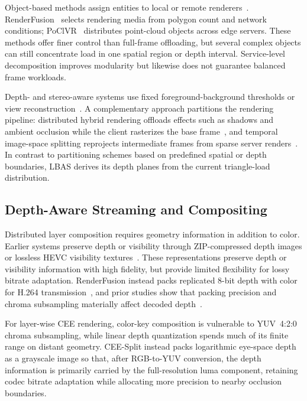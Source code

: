 \documentclass[acmsmall]{acmart}
\begin{document}
Object-based methods assign entities to local or remote renderers~\cite{lu_renderfusion_2023,wen_ar-light_2025,wu_edge-assisted_2024}. RenderFusion~\cite{lu_renderfusion_2023} selects rendering media from polygon count and network conditions; PoClVR~\cite{wu_edge-assisted_2024} distributes point-cloud objects across edge servers. These methods offer finer control than full-frame offloading, but several complex objects can still concentrate load in one spatial region or depth interval. Service-level decomposition improves modularity but likewise does not guarantee balanced frame workloads.

Depth- and stereo-aware systems use fixed foreground-background thresholds or view reconstruction~\cite{lai_furion_2020,meng_coterie_2020,ke_collabvr_2023,chen_you_2025}. A complementary approach partitions the rendering pipeline: distributed hybrid rendering offloads effects such as shadows and ambient occlusion while the client rasterizes the base frame~\cite{tan_dhr_2022,tan_dhrs_2024}, and temporal image-space splitting reprojects intermediate frames from sparse server renders~\cite{steiner_imagebased_2025}. In contrast to partitioning schemes based on predefined spatial or depth boundaries, LBAS derives its depth planes from the current triangle-load distribution.

\subsection{Depth-Aware Streaming and Compositing}

Distributed layer composition requires geometry information in addition to color. Earlier systems preserve depth or visibility through ZIP-compressed depth images or lossless HEVC visibility textures~\cite{chaudhuri_distributed_2008,stengel_lossless_2021}. These representations preserve depth or visibility information with high fidelity, but provide limited flexibility for lossy bitrate adaptation. RenderFusion instead packs replicated 8-bit depth with color for H.264 transmission~\cite{lu_renderfusion_2023}, and prior studies show that packing precision and chroma subsampling materially affect decoded depth~\cite{pece_depth_2011,siekkinen_depth_2023}.

For layer-wise CEE rendering, color-key composition is vulnerable to YUV~4:2:0 chroma subsampling, while linear depth quantization spends much of its finite range on distant geometry. CEE-Split instead packs logarithmic eye-space depth as a grayscale image so that, after RGB-to-YUV conversion, the depth information is primarily carried by the full-resolution luma component, retaining codec bitrate adaptation while allocating more precision to nearby occlusion boundaries.
\end{document}
